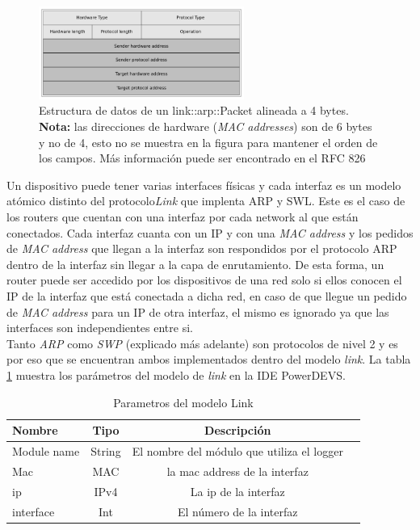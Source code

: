\documentclass[10pt,a4paper]{article}
\begin{document}
\begin{figure}[!htb]
    \centering
    \includegraphics[width = 0.6\textwidth]{img/png/arp-packet.png}
    \caption{Estructura de datos de un link::arp::Packet alineada a 4 bytes. \textbf{Nota:} las direcciones de hardware (\textit{MAC addresses}) son de 6 bytes y no de 4, esto no se muestra en la figura para mantener el orden de los campos. Más información puede ser encontrado en el RFC 826 \cite{plummer1982ethernet}}
    \label{figure: arp packet}
\end{figure}


Un dispositivo puede tener varias interfaces físicas y cada interfaz es un modelo atómico distinto del protocolo\textit{Link} que implenta ARP y SWL. Este es el caso de los routers que cuentan con una interfaz por cada network al que están conectados. Cada interfaz cuanta con un IP y con una \textit{MAC address} y los pedidos de \textit{MAC address} que llegan a la interfaz son respondidos por el protocolo ARP dentro de la interfaz sin llegar a la capa de enrutamiento. De esta forma, un router puede ser accedido por los dispositivos de una red solo si ellos conocen el IP de la interfaz que está conectada a dicha red, en caso de que llegue un pedido de \textit{MAC address} para un IP de otra interfaz, el mismo es ignorado ya que las interfaces son independientes entre si. \\

Tanto \textit{ARP} como \textit{SWP} (explicado más adelante) son protocolos de nivel 2 y es por eso que se encuentran ambos implementados dentro del modelo \textit{link}. La tabla \ref{table: parameters link} muestra los parámetros del modelo de \textit{link} en la IDE PowerDEVS. 

\begin{table}[h]
\begin{tabular}{|l|c|c|c|}
  \hline
  \textbf{Nombre} & \textbf{Tipo} & \textbf{Descripción} \\
  \hline
  Module name & String & El nombre del módulo que utiliza el logger \\
  \hline
  Mac & MAC & la mac address de la interfaz \\
  \hline
  ip & IPv4 & La ip de la interfaz \\
  \hline
  interface & Int & El número de la interfaz \\
  \hline
\end{tabular}
\caption{Parametros del modelo Link}
\label{table: parameters link}
\end{table}
\end{document}

